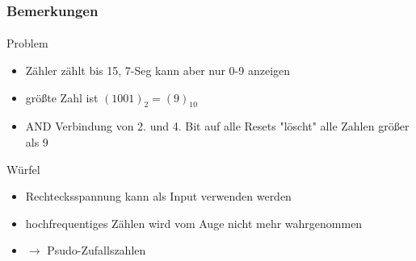 \begin{frame}
    \frametitle{Bemerkungen}
    \framesubtitle{}
    \begin{block}{Problem}
         \begin{itemize}
             \item Zähler zählt bis 15, 7-Seg kann aber nur 0-9 anzeigen
             \item größte Zahl ist $(1001)_2 = (9)_{10}$
             \item AND Verbindung von 2. und 4. Bit auf alle Resets "löscht"
             alle Zahlen größer als 9
         \end{itemize}
    \end{block}
    \begin{block}{Würfel}
         \begin{itemize}
             \item Rechtecksspannung kann als Input verwenden werden
             \item hochfrequentiges Zählen wird vom Auge nicht mehr
             wahrgenommen
             \item $\rightarrow$ Psudo-Zufallszahlen
         \end{itemize}
    \end{block}
\end{frame}
